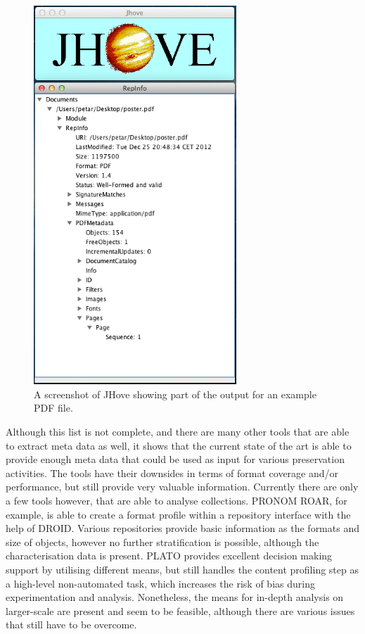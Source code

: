 \begin{figure}[th]
\begin{center}
\includegraphics[width=3in]{figures/related/jhove_example.png}
\caption{A screenshot of JHove showing part of the output for an example PDF file.}
\label{fig:jhove_screenshot}
\end{center}
\end{figure}

Although this list is not complete, and there are many other tools that are able to extract meta data as well, it shows that the current state of the art is able to provide enough meta data that could be used as input for various preservation activities. The tools have their downsides in terms of format coverage and/or performance, but still provide very valuable information.
Currently there are only a few tools however, that are able to analyse collections. PRONOM ROAR, for example, is able to create a format profile within a repository interface with the help of DROID.
Various repositories provide basic information as the formats and size of objects, however no further stratification is possible, although the characterisation data is present.
PLATO provides excellent decision making support by utilising different means, but still handles the content profiling step as a high-level non-automated task, which increases the risk of bias during experimentation and analysis.
Nonetheless, the means for in-depth analysis on larger-scale are present and seem to be feasible, although there are various issues that still have to be overcome.

